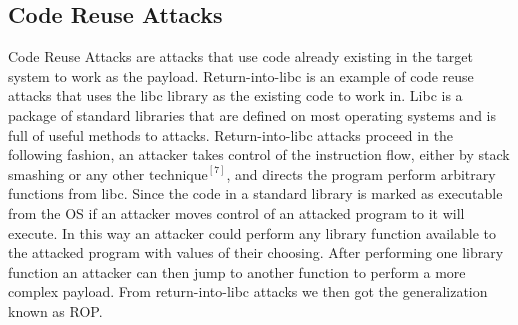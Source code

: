 \documentclass[11pt]{amsart}
\begin{document}
\subsection*{Code Reuse Attacks}
Code Reuse Attacks are attacks that use code already existing in the target system to work as the payload. Return-into-libc is an example of code reuse attacks that uses the libc library as the existing code to work in. Libc is a package of standard libraries that are defined on most operating systems and is full of useful methods to attacks. Return-into-libc attacks proceed in the following fashion, an attacker takes control of the instruction flow, either by stack smashing or any other $\text{technique}^{[7]}$, and directs the program perform arbitrary functions from libc. Since the code in a standard library is marked as executable from the OS if an attacker moves control of an attacked program to it will execute. In this way an attacker could perform any library function available to the attacked program with values of their choosing. After performing one library function an attacker can then jump to another function to perform a more complex payload. From return-into-libc attacks we then got the generalization known as ROP.
\end{document}
